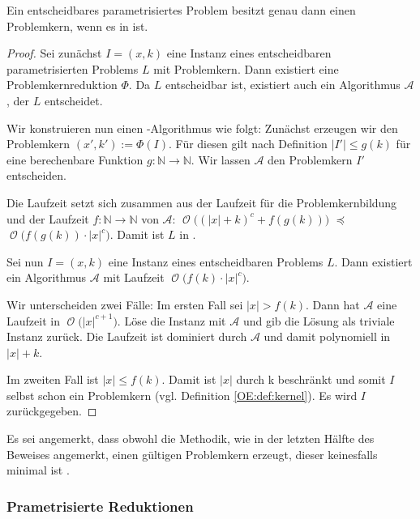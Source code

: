 \documentclass[a4paper,ngerman]{atseminar}
\newcommand{\N}{\ensuremath{\mathbb{N}}\xspace}
\renewcommand{\A}{\ensuremath{\mathcal{A}}\xspace}
\newcommand{\BigO}[1]{\ensuremath{\operatorname{\mathcal{O}}\bigl(#1\bigr)}\xspace}
\begin{document}
\begin{theorem}
  Ein entscheidbares parametrisiertes Problem besitzt genau dann einen Problemkern, wenn es in \FPT\xspace ist.
\end{theorem}
\begin{proof}
    Sei zunächst $I = (x, k)$ eine Instanz eines entscheidbaren parametrisierten Problems $L$ mit Problemkern. Dann existiert eine Problemkernreduktion
    $\Phi$. Da $L$ entscheidbar ist, existiert auch ein Algorithmus \A, der $L$ entscheidet.
  
    \noindent
    Wir konstruieren nun einen \FPT-Algorithmus wie folgt:
    Zunächst erzeugen wir den Problemkern $(x', k') := \Phi(I)$. Für diesen gilt nach Definition $|I'| \leq g(k)$ für eine berechenbare Funktion
    $g: \N \rightarrow \N$. Wir lassen \A den Problemkern $I'$ entscheiden.
  
    \noindent
    Die Laufzeit setzt sich zusammen aus der Laufzeit für die Problemkernbildung und der Laufzeit $f: \N \rightarrow \N$ von \A:
    \BigO{(|x| + k)^c + f(g(k))} $\preceq$ \BigO{f(g(k)) \cdot |x|^c}. 
    Damit ist $L$ in \FPT.

    \vspace{0.25cm}
    \noindent
    Sei nun $I = (x, k)$ eine Instanz eines entscheidbaren \FPT\xspace Problems $L$.
    Dann existiert ein Algorithmus \A mit Laufzeit \BigO{f(k) \cdot |x|^c}.

    \noindent
    Wir unterscheiden zwei Fälle:
    Im ersten Fall sei $|x| > f(k)$. Dann hat \A eine Laufzeit in \BigO{|x|^{c+1}}. Löse die Instanz mit \A und gib die Lösung
    als triviale Instanz zurück. Die Laufzeit ist dominiert durch \A und damit polynomiell in $|x| + k$.
    
    \noindent
    Im zweiten Fall ist $|x| \leq f(k)$. Damit ist $|x|$ durch k beschränkt und somit $I$ selbst schon ein Problemkern (vgl. Definition \ref{OE:def:kernel}).
    Es wird $I$ zurückgegeben.
  \end{proof}

  \noindent
  Es sei angemerkt, dass obwohl die Methodik, wie in der letzten Hälfte des Beweises angemerkt, einen gültigen Problemkern erzeugt, dieser
  keinesfalls minimal ist \cite{Beyond}.

\subsubsection{Prametrisierte Reduktionen}
\end{document}

